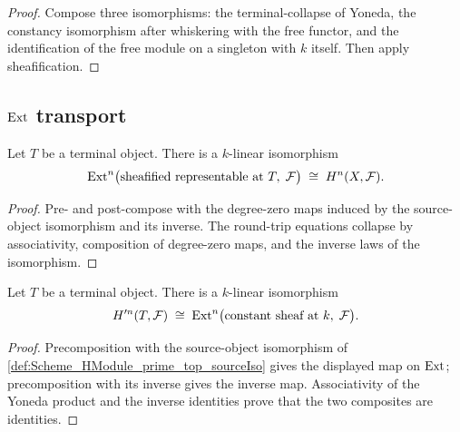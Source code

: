 \begin{proof}


\leanok
  Compose three isomorphisms: the terminal-collapse of Yoneda, the constancy isomorphism after whiskering with the free functor, and the identification of the free module on a singleton with \(k\) itself. Then apply sheafification.
\end{proof}

\subsection{\(\operatorname{Ext}\) transport}

\begin{definition}\leanok
  \label{def:Scheme_HModule_top_linearEquiv}

  Let \(T\) be a terminal object. There is a \(k\)-linear isomorphism
  \[
    \operatorname{Ext}^{n}\bigl(\text{sheafified representable at }T,\; \mathcal F\bigr) \;\cong\; H^{n}(X, \mathcal F).
  \]
\end{definition}

\begin{proof}


\leanok
  Pre- and post-compose with the degree-zero maps induced by the source-object isomorphism and its inverse. The round-trip equations collapse by associativity, composition of degree-zero maps, and the inverse laws of the isomorphism.
\end{proof}

\begin{definition}\leanok
  \label{def:Scheme_HModule_prime_top_linearEquiv}

  Let \(T\) be a terminal object. There is a \(k\)-linear isomorphism
  \[
    H^{\prime n}(T, \mathcal F) \;\cong\; \operatorname{Ext}^{n}\bigl(\text{constant sheaf at }k,\; \mathcal F\bigr).
  \]
\end{definition}

\begin{proof}


\leanok
  Precomposition with the source-object isomorphism of \cref{def:Scheme_HModule_prime_top_sourceIso} gives the displayed map on \(\operatorname{Ext}\); precomposition with its inverse gives the inverse map. Associativity of the Yoneda product and the inverse identities prove that the two composites are identities.
\end{proof}

